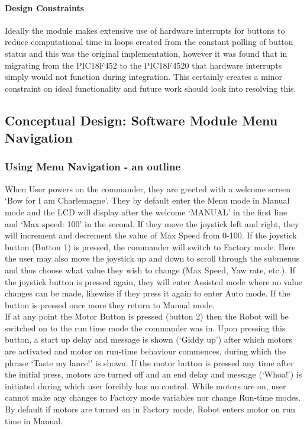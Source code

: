 \documentclass[MTRX3700report.tex]{subfiles}
\begin{document}
	\paragraph{Design Constraints}
	Ideally the module makes extensive use of hardware interrupts for buttons to reduce computational time in loops created from the constant polling of button status and this was the original implementation, however it was found that in migrating from the PIC18F452 to the PIC18F4520 that hardware interrupts simply would not function during integration. This certainly creates a minor constraint on ideal functionality and future work should look into resolving this.
	
	\subsection{Conceptual Design: Software Module Menu Navigation}

	
	\subsubsection{Using Menu Navigation - an outline}
	When User powers on the commander, they are greeted with a welcome screen `Bow for I am Charlemagne'. They by default enter the Menu mode in Manual mode and the LCD will display after the welcome `MANUAL' in the first line and `Max speed: 100' in the second. If they move the joystick left and right, they will increment and decrement the value of Max Speed from 0-100. If the joystick button (Button 1) is pressed, the commander will switch to Factory mode. Here the user may also move the joystick up and down to scroll through the submenus and thus choose what value they wish to change (Max Speed, Yaw rate, etc.). If the joystick button is pressed again, they will enter Assisted mode where no value changes can be made, likewise if they press it again to enter Auto mode. If the button is pressed once more they return to Manual mode.\\
	
	If at any point the Motor Button is pressed (button 2) then the Robot will be switched on to the run time mode the commander was in. Upon pressing this button, a start up delay and message is shown (`Giddy up') after which motors are activated and motor on run-time behaviour commences, during which the phrase `Taste my lance!' is shown. If the motor button is pressed any time after the initial press, motors are turned off and an end delay and message (`Whoa!') is initiated during which user forcibly has no control. While motors are on, user cannot make any changes to Factory mode variables nor change Run-time modes. By default if motors are turned on in Factory mode, Robot enters motor on run time in Manual.
	
\end{document}
